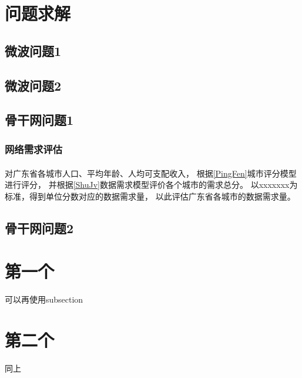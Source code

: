 \documentclass[UTF8,12pt]{ctexart}
\newcommand{\upcite}[1]{\textsuperscript{\cite{#1}}}
\begin{document}
\section{问题求解}
    \subsection{微波问题1}
    \subsection{微波问题2}
    \subsection{骨干网问题1}
        \subsubsection[网络需求评估]{网络需求评估}
            对广东省各城市人口、平均年龄、人均可支配收入\upcite{SJ}，
            根据\ref{PingFen}城市评分模型进行评分，
            并根据\ref{ShuJv}数据需求模型评价各个城市的需求总分。
            以xxxxxxx为标准，得到单位分数对应的数据需求量，
            以此评估广东省各城市的数据需求量。            
    \subsection{骨干网问题2}



\begin{appendices}
    \section{第一个}
        可以再使用subsection
    \section{第二个}
        同上
    \end{appendices} 



\begin{thebibliography}{20}   %
\end{thebibliography}
\end{document}
